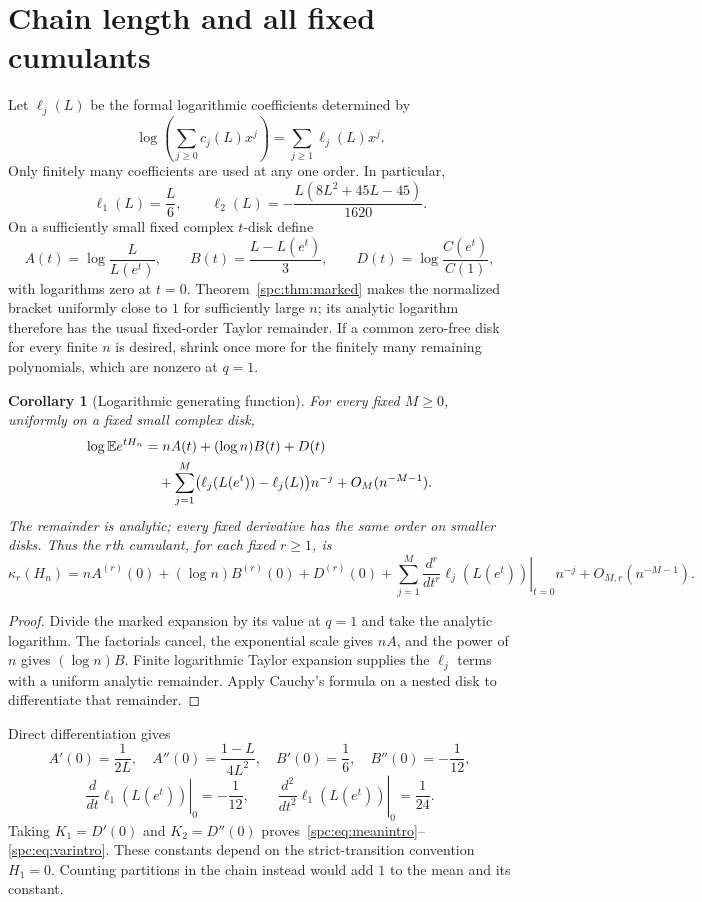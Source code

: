\documentclass[11pt,letterpaper]{article}
\newtheorem{corollary}[theorem]{Corollary}
\theoremstyle{definition}\newtheorem{definition}[theorem]{Definition}
\theoremstyle{remark}\newtheorem{remark}[theorem]{Remark}
\newcommand{\E}{\mathbb E}
\begin{document}
\section{Chain length and all fixed cumulants}\label{spc:sec:cumulants}
Let $\ell_j(L)$ be the formal logarithmic coefficients determined by
\begin{equation}\label{spc:eq:ell}
 \log\left(\sum_{j\ge0}c_j(L)x^j\right)=\sum_{j\ge1}\ell_j(L)x^j.
\end{equation}
Only finitely many coefficients are used at any one order. In particular,
\[
 \ell_1(L)=\frac L6,\qquad
 \ell_2(L)=-\frac{L(8L^2+45L-45)}{1620}.
\]
On a sufficiently small fixed complex $t$-disk define
\begin{equation}\label{spc:eq:ABD}
 A(t)=\log\frac{L}{L(e^t)},\qquad
 B(t)=\frac{L-L(e^t)}3,\qquad
 D(t)=\log\frac{C(e^t)}{C(1)},
\end{equation}
with logarithms zero at $t=0$. Theorem~\ref{spc:thm:marked} makes the normalized bracket uniformly close to $1$ for sufficiently large $n$; its analytic logarithm therefore has the usual fixed-order Taylor remainder. If a common zero-free disk for every finite $n$ is desired, shrink once more for the finitely many remaining polynomials, which are nonzero at $q=1$.

\begin{corollary}[Logarithmic generating function]\label{spc:cor:logmgf}
For every fixed $M\ge0$, uniformly on a fixed small complex disk,
\begin{align}\label{spc:eq:logmgf}
 \log\E e^{tH_n}
 &=nA(t)+(\log n)B(t)+D(t)\notag\\
 &\quad+\sum_{j=1}^M\bigl(\ell_j(L(e^t))-\ell_j(L)\bigr)n^{-j}
       +O_M(n^{-M-1}).
\end{align}
The remainder is analytic; every fixed derivative has the same order on smaller disks. Thus the $r$th cumulant, for each fixed $r\ge1$, is
\begin{equation}\label{spc:eq:cumulants}
 \kappa_r(H_n)=nA^{(r)}(0)+(\log n)B^{(r)}(0)+D^{(r)}(0)
 +\sum_{j=1}^M\left.\frac{d^r}{dt^r}\ell_j(L(e^t))\right|_{t=0}n^{-j}
 +O_{M,r}(n^{-M-1}).
\end{equation}
\end{corollary}
\begin{proof}
Divide the marked expansion by its value at $q=1$ and take the analytic logarithm. The factorials cancel, the exponential scale gives $nA$, and the power of $n$ gives $(\log n)B$. Finite logarithmic Taylor expansion supplies the $\ell_j$ terms with a uniform analytic remainder. Apply Cauchy's formula on a nested disk to differentiate that remainder.
\end{proof}
Direct differentiation gives
\[
 A'(0)=\frac1{2L},\quad A''(0)=\frac{1-L}{4L^2},\quad
 B'(0)=\frac16,\quad B''(0)=-\frac1{12},
\]
\[
 \left.\frac d{dt}\ell_1(L(e^t))\right|_0=-\frac1{12},\qquad
 \left.\frac {d^2}{dt^2}\ell_1(L(e^t))\right|_0=\frac1{24}.
\]
Taking $K_1=D'(0)$ and $K_2=D''(0)$ proves~\eqref{spc:eq:meanintro}--\eqref{spc:eq:varintro}. These constants depend on the strict-transition convention $H_1=0$. Counting partitions in the chain instead would add $1$ to the mean and its constant.
\end{document}
